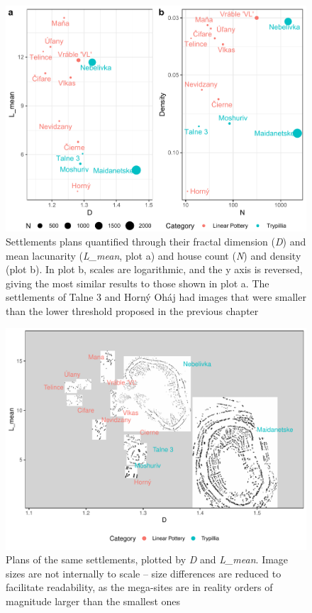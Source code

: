 \documentclass[
  12pt,
  a4paper, twoside]{book}
\begin{document}
\begin{figure}

{\centering \includegraphics[width=0.9\linewidth]{bookdown-demo_files/figure-latex/09-settle-points-1} 

}

\caption[D and L\_mean, N and density of settlement images]{Settlements plans quantified through their fractal dimension (\emph{D}) and mean lacunarity (\emph{L\_mean}, plot a) and house count (\emph{N}) and density (plot b). In plot b, scales are logarithmic, and the y axis is reversed, giving the most similar results to those shown in plot a. The settlements of Talne 3 and Horný Oháj had images that were smaller than the lower threshold proposed in the previous chapter}\label{fig:09-settle-points}
\end{figure}



\begin{figure}

{\centering \includegraphics[width=0.9\linewidth]{Results/fig09_settlements} 

}

\caption[Settlement plans, plotted by D and L\_mean estimates]{Plans of the same settlements, plotted by \emph{D} and \emph{L\_mean}. Image sizes are not internally to scale -- size differences are reduced to facilitate readability, as the mega-sites are in reality orders of magnitude larger than the smallest ones}\label{fig:09-settlements}
\end{figure}
\end{document}
